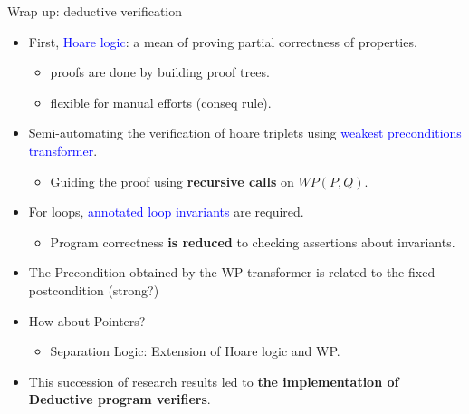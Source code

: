 \begin{frame}{Wrap up: deductive verification}
\begin{itemize}
	\item First, \textcolor{blue}{Hoare logic}: a mean of proving partial correctness of properties.
	\begin{itemize}
		\item proofs are done by building proof trees.
		\item flexible for manual efforts (conseq rule).
	\end{itemize}
\item Semi-automating the verification of hoare triplets using \textcolor{blue}{weakest preconditions transformer}.
\begin{itemize}
	\item Guiding the proof using \textbf{recursive calls} on $WP(P,Q)$.
\end{itemize}
\item For loops, \textcolor{blue}{annotated loop invariants} are required.
\begin{itemize}
	\item Program correctness \textbf{is reduced} to checking assertions about invariants.
	
\end{itemize}
\item The Precondition obtained by the WP transformer is related to the fixed postcondition (strong?)
\item How about Pointers?
\begin{itemize}
	\item Separation Logic: Extension of Hoare logic and WP.
\end{itemize}
\item This succession of research results led to \textbf{the implementation of Deductive program verifiers}.
\end{itemize}
\end{frame}



